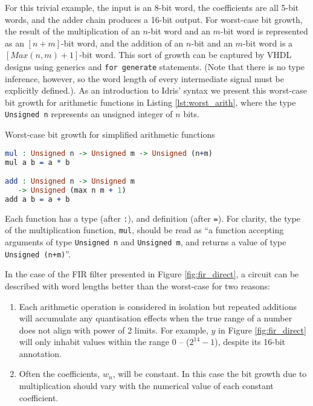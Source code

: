 \documentclass[conference]{IEEEtran}
\begin{document}

For this trivial example, the input is an 8-bit word, the coefficients are all
5-bit words, and the adder chain produces a 16-bit output. For worst-case bit
growth, the result of the multiplication of an $n$-bit word and an $m$-bit word
is represented as an $[n+m]$-bit word, and the addition of an $n$-bit and an
$m$-bit word is a $[Max(n,m)+1]$-bit word. This sort of growth can be captured
by VHDL designs using generics and \texttt{for generate} statements. (Note that
there is no type inference, however, so the word length of every intermediate
signal must be explicitly defined.). As an introduction to Idris' syntax we
present this worst-case bit growth for arithmetic functions in Listing
\ref{lst:worst_arith}, where the type \texttt{Unsigned n} represents an unsigned
integer of $n$ bits.

\begin{codefig}[h]
  \caption{Worst-case bit growth for simplified arithmetic functions}
\begin{lstlisting}[language=idris]
mul : Unsigned n -> Unsigned m -> Unsigned (n+m)
mul a b = a * b

add : Unsigned n -> Unsigned m
   -> Unsigned (max n m + 1)
add a b = a + b
\end{lstlisting}
\label{lst:worst_arith}
\end{codefig}

Each function has a type (after \texttt{:}), and definition (after \texttt{=}).
For clarity, the type of the multiplication function, \texttt{mul}, should be
read as ``a function accepting arguments of type \texttt{Unsigned n} and
\texttt{Unsigned m}, and returns a value of type \texttt{Unsigned (n+m)}''.

In the case of the FIR filter presented in Figure \ref{fig:fir_direct}, a circuit can be described with word lengths better than the worst-case for two reasons:

\begin{enumerate}
\item Each arithmetic operation is considered in isolation but repeated
  additions will accumulate any quantisation effects when the true range of a
  number does not align with power of 2 limits. For example, $y$ in Figure
  \ref{fig:fir_direct} will only inhabit values within the range $0$ --
  ($2^{14}-1$), despite its 16-bit annotation.
\item Often the coefficients, $w_n$, will be constant. In this case the bit
  growth due to multiplication should vary with the numerical value of each
  constant coefficient.
\end{enumerate}
\end{document}
